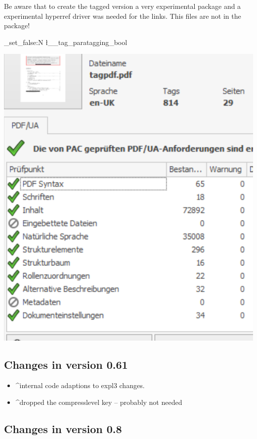 \documentclass[DIV=12,parskip=half-,bibliography=totoc]{scrartcl}
\newcommand\parataggingON {\bool_set_true:N \l__tag_paratagging_bool}
\newcommand\parataggingOff{\bool_set_false:N \l__tag_paratagging_bool}
\begin{document}
\begin{tcolorbox}[before upper=\parataggingON]
Be aware that to create the tagged version a very experimental package and a experimental hyperref driver was needed for the links. This files are not in the package!
\end{tcolorbox}

\parataggingOff

\includegraphics{pac3}
\tagmcend\tagstructend

\subsection{Changes in version 0.61}
\begin{itemize}
\item \TagP^internal code adaptions to expl3 changes.\Pmeti
\item \TagP^dropped the compresslevel key  -- probably not needed\Pmeti
\end{itemize}

\subsection{Changes in version 0.8}
\end{document}
